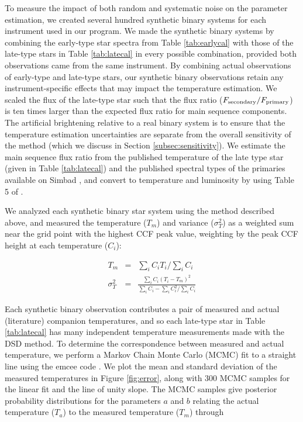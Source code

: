 \documentclass{emulateapj}
\begin{document}
To measure the impact of both random and systematic noise on the parameter estimation, we created several hundred synthetic binary systems for each instrument used in our program. We made the synthetic binary systems by combining the early-type star spectra from Table \ref{tab:earlycal} with those of the late-type stars in Table \ref{tab:latecal} in every possible combination, provided both observations came from the same instrument. By combining actual observations of early-type and late-type stars, our synthetic binary observations retain any instrument-specific effects that may impact the temperature estimation. We scaled the flux of the late-type star such that the flux ratio ($F_{\rm secondary}/F_{\rm primary}$) is ten times larger than the expected flux ratio for main sequence components. The artificial brightening relative to a real binary system is to ensure that the temperature estimation uncertainties are separate from the overall sensitivity of the method (which we discuss in Section \ref{subsec:sensitivity}). We estimate the main sequence flux ratio from the published temperature of the late type star (given in Table \ref{tab:latecal}) and the published spectral types of the primaries available on Simbad \citep{Simbad}, and convert to temperature and luminosity by using Table 5 of \citet{Pecaut2013}.


We analyzed each synthetic binary star system using the method described above, and measured the temperature ($T_m$) and variance ($\sigma_T^2$) as a weighted sum near the grid point with the highest CCF peak value, weighting by the peak CCF height at each temperature ($C_i$):

\begin{eqnarray}
\label{eqn:tmeas} 
T_m &=& \sum_i C_i T_i / \sum_i C_i \\
\sigma_T^2 &=& \frac{\sum_i C_i (T_i - T_m)^2}{ \sum_i C_i - \sum_i C_i^2 / \sum_i C_i}
\end{eqnarray}

Each synthetic binary observation contributes a pair of measured and actual (literature) companion temperatures, and so each late-type star in Table \ref{tab:latecal} has many independent temperature measurements made with the DSD method. To determine the correspondence between measured and actual temperature, we perform a Markov Chain Monte Carlo (MCMC) fit to a straight line using the emcee code \citep{emcee}. We plot the mean and standard deviation of the measured temperatures in Figure \ref{fig:error}, along with 300 MCMC samples for the linear fit and the line of unity slope. The MCMC samples give posterior probability distributions for the parameters $a$ and $b$ relating the actual temperature ($T_a$) to the measured temperature ($T_m$) through
\end{document}
